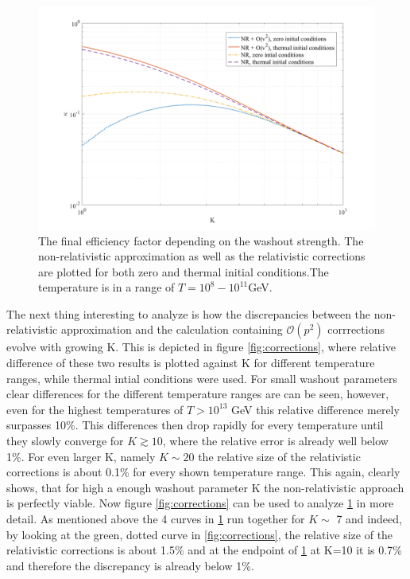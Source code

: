 \begin{figure}[H]
	\centering
	\includegraphics[width=\linewidth]{Images/efficiency}
	\caption{The final efficiency factor depending on the washout strength. The non-relativistic approximation as well as the relativistic corrections are plotted for both zero and thermal initial conditions.The temperature is in a range of $T=10^{8}-10^{11}$GeV.}
	\label{fig:efficiency}
\end{figure}
The next thing interesting to analyze is how the discrepancies between the non-relativistic approximation and the calculation containing $\mathcal{O}(p^2)$ corrrections evolve with growing K. This is depicted in figure \ref{fig:corrections}, where relative difference of these two results is plotted against K for different temperature ranges, while thermal intial conditions were used. For small washout parameters clear differences for the different temperature ranges are can be seen, however, even for the highest temperatures of $T>10^{13}$ GeV this relative difference merely surpasses 10\%. This differences then drop rapidly for every temperature until they slowly converge for $K\gtrsim10$, where the relative error is already well below 1\%. For even larger K, namely $K\sim20$ the relative size of the relativistic corrections is about 0.1\% for every shown temperature range. This again, clearly shows, that for high a enough washout parameter K the non-relativistic approach is perfectly viable. \newline \indent
Now figure \ref{fig:corrections} can be used to analyze \ref{fig:efficiency} in more detail. As mentioned above the 4 curves in \ref{fig:efficiency} run together for $K\sim$ 7 and indeed, by looking at the green, dotted curve in \ref{fig:corrections}, the relative size of the relativistic corrections is about 1.5\% and at the endpoint of \ref{fig:efficiency} at K=10 it is 0.7\% and therefore the discrepancy is already below 1\%.
